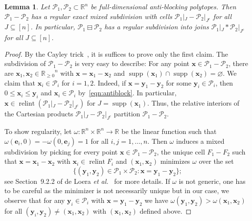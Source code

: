 \documentclass[11pt]{amsart}
\newtheorem{lem}[thm]{Lemma}
\theoremstyle{definition}
\begin{document}
\begin{lem}\label{lem:AB_canonical}
    Let ${\mathcal{P}}_1, {\mathcal{P}}_2 \subset {\mathbb{R}}^n$ be full-dimensional anti-blocking
    polytopes.  Then ${\mathcal{P}}_1 - {\mathcal{P}}_2$ has a regular exact mixed subdivision
    with cells ${\mathcal{P}}_1|_{J} - {\mathcal{P}}_2|_{J^c}$ for all $J \subseteq [n]$. In
    particular, ${{{{\mathcal{P}}_1} \boxminus {{\mathcal{P}}_2}}}$ has a regular subdivision into joins
    ${\mathcal{P}}_1|_{J} * {\mathcal{P}}_2|_{J^c}$ for all $J \subseteq [n]$.
\end{lem}
\begin{proof}
    By the Cayley trick~\cite[Thm~9.2.18]{DLRS}, it is suffices to prove only
    the first claim. The subdivision of ${\mathcal{P}}_1 - {\mathcal{P}}_2$ is very easy to
    describe: For any point ${\mathbf{x}} \in {\mathcal{P}}_1 - {\mathcal{P}}_2$, there are ${\mathbf{x}}_1,{\mathbf{x}}_2 \in
    {{\mathbb{R}}_{\ge0}}^n$ with ${\mathbf{x}} = {\mathbf{x}}_1 - {\mathbf{x}}_2$ and $\operatorname{supp}({\mathbf{x}}_1) \cap \operatorname{supp}({\mathbf{x}}_2) =
    {\varnothing}$.  We claim that ${\mathbf{x}}_i \in {\mathcal{P}}_i$ for $i=1,2$. Indeed, if ${\mathbf{x}} =
    {\mathbf{y}}_1 - {\mathbf{y}}_2$ for some ${\mathbf{y}}_i \in {\mathcal{P}}_i$, then $0 \le {\mathbf{x}}_i \le {\mathbf{y}}_i$ and ${\mathbf{x}}_i
    \in {\mathcal{P}}_i$ by~\eqref{eqn:antiblock}.  In particular, ${\mathbf{x}} \in \operatorname{relint}(
    {\mathcal{P}}_1|_{J} - {\mathcal{P}}_2|_{J^c} )$ for $J = \operatorname{supp}({\mathbf{x}}_1)$. Thus, the relative
    interiors of the Cartesian products ${\mathcal{P}}_1|_{J} - {\mathcal{P}}_2|_{J^c}$ partition
    ${\mathcal{P}}_1 - {\mathcal{P}}_2$.

    To show regularity, let $\omega : {\mathbb{R}}^n \times {\mathbb{R}}^n \rightarrow {\mathbb{R}}$ be the
    linear function such that $\omega({\mathbf{e}}_i,0) = -\omega(0,{\mathbf{e}}_j) = 1$ for all
    $i,j = 1,\dots,n$. Then $\omega$ induces a mixed subdivision by picking
    for every point ${\mathbf{x}} \in {\mathcal{P}}_1 - {\mathcal{P}}_2$, the unique cell $F_1 - F_2$ such
    that
    ${\mathbf{x}} = {\mathbf{x}}_1 - {\mathbf{x}}_2$ with ${\mathbf{x}}_i \in \operatorname{relint} F_i$ and $({\mathbf{x}}_1,{\mathbf{x}}_2)$
    minimizes $\omega$ over the set
    \[
        \{ ({\mathbf{y}}_1,{\mathbf{y}}_2) \in {\mathcal{P}}_1 \times {\mathcal{P}}_2 : {\mathbf{x}} = {\mathbf{y}}_1 - {\mathbf{y}}_2 \};
    \]
    see Section~9.2.2 of de Loera \emph{et al.}~\cite{DLRS} for more details.
    If $\omega$ is not generic, one has to be careful as the minimizer is not
    necessarily unique but in our case, we observe that for any ${\mathbf{y}}_i \in
    {\mathcal{P}}_i$ with ${\mathbf{x}} = {\mathbf{y}}_1 - {\mathbf{y}}_2$ we have $\omega({\mathbf{y}}_1,{\mathbf{y}}_2) >
    \omega({\mathbf{x}}_1,{\mathbf{x}}_2)$ for all $({\mathbf{y}}_i,{\mathbf{y}}_2)\neq({\mathbf{x}}_1,{\mathbf{x}}_2)$ with $({\mathbf{x}}_1,{\mathbf{x}}_2)$ defined above.
\end{proof}
\end{document}
